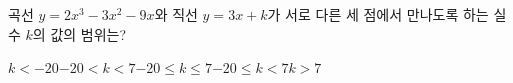 곡선 $y=2x^3-3x^2-9x$와 직선 $y=3x+k$가 서로 다른 세 점에서 만나도록 하는 실수 $k$의 값의 범위는?
\begin{choicesii}{$k<-20$}{$-20<k<7$}{$-20\le k\le 7$}{$-20\le k<7$}{$k>7$}\end{choicesii}
